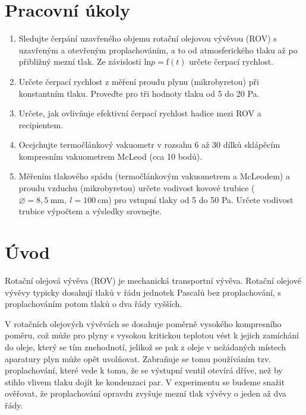 \documentclass[english]{article}
\newcommand{\unit}[1]{\mathrm{#1}}
\begin{document}


\setlength{\parindent}{0.5cm}

\section{Pracovní úkoly}
\begin{enumerate}
	\item Sledujte čerpání uzavřeného objemu rotační olejovou vývěvou (ROV)
	s uzavřeným a otevřeným proplachováním, a to od atmosferického tlaku
	až po přibližný mezní tlak. Ze závislosti $\unit{ln}p=\unit{f}(t)$ určete
	čerpací rychlost. 
	\item Určete čerpací rychlost z měření proudu plynu (mikrobyretou) při konstantním
	tlaku. Proveďte pro tři hodnoty tlaku od 5 do 20 Pa. 
	\item Určete, jak ovlivňuje efektivní čerpací rychlost hadice mezi ROV a
	recipientem. 
	\item Ocejchujte termočlánkový vakuometr v rozsahu 6 až 30 dílků sklápěcím
	kompresním vakuometrem McLeod (cca 10 bodů). 
	\item Měřením tlakového spádu (termočlánkovým vakuometrem a McLeodem) a
	proudu vzduchu (mikrobyretou) určete vodivost kovové trubice ($\diameter=8,5~\unit{mm},\ l=100~\unit{cm}$)
	pro vstupní tlaky od 5 do 50 Pa. Určete vodivost trubice výpočtem
	a výsledky srovnejte. 
\end{enumerate}

\section{Úvod}

Rotační olejová vývěva (ROV) je mechanická transportní vývěva. Rotační olejové vývěvy typicky dosahují
tlaků v řádu jednotek Pascalů bez proplachování, s proplachováním
potom tlaků o dva řády vyšších. 

V rotačních olejových vývěvách se dosahuje poměrně vysokého kompresního
poměru, což může pro plyny s vysokou kritickou teplotou vést k jejich
zamíchání do oleje, který se tím znehodnotí, jelikož se pak z oleje
v nežádaných místech aparatury plyn může opět uvolňovat. Zabraňuje
se tomu používáním tzv. proplachování, které vede k tomu, že se výstupní
ventil otevírá dříve, než by stihlo vlivem tlaku dojít ke kondenzaci
par. V experimentu se budeme snažit ověřovat, že proplachování opravdu
zvyšuje mezní tlak vývěvy o jeden až dva řády. 
\end{document}
